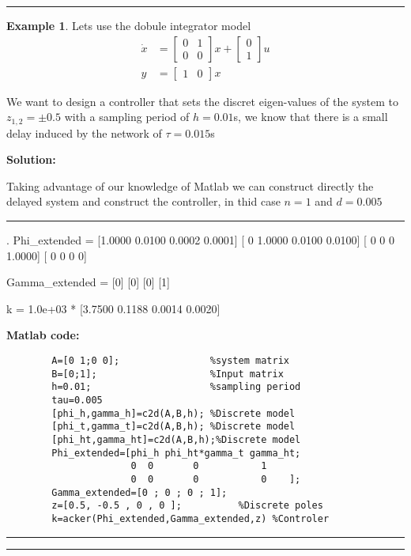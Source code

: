 \documentclass[nols]{tufte-handout}
\theoremstyle{definition}
\newtheorem{exmp}{Example}[section]
\begin{document}

\vspace{1cm}
\hrule height 1pt
\begin{exmp}


Lets use the dobule integrator model
\begin{align*}
\dot{x}
&=
\begin{bmatrix}
0 & 1\\
0 & 0
\end{bmatrix}
x+
\begin{bmatrix}
0\\
1
\end{bmatrix}
u\\
y&=
\begin{bmatrix}
1 & 0
\end{bmatrix}
x
\end{align*}

We want to design a controller that sets the discret eigen-values of the system to $z_{1,2}=\pm 0.5$ with a sampling period of $h=0.01$s, we know that there is a small delay induced by the network of $\tau=0.015$s 

    \textbf{Solution:}

Taking advantage of our knowledge of Matlab we can construct directly the delayed system and construct the controller, in thid case $n=1$ and $d=0.005$

    \noindent\hfil\rule{\textwidth}{.4pt}\hfil
       \begin{verbbox}[\footnotesize]
                                                            .           
Phi_extended =
[1.0000    0.0100    0.0002    0.0001]
[     0    1.0000    0.0100    0.0100]
[     0         0         0    1.0000]
[     0         0         0         0]

Gamma_extended =
[0]
[0]
[0]
[1]

k =
1.0e+03 *
[3.7500    0.1188    0.0014    0.0020]

    \end{verbbox} 
\textbf{Matlab code:}
    \begin{verbatim}
        A=[0 1;0 0];                %system matrix
        B=[0;1];                    %Input matrix
        h=0.01;                     %sampling period
        tau=0.005
        [phi_h,gamma_h]=c2d(A,B,h); %Discrete model
        [phi_t,gamma_t]=c2d(A,B,h); %Discrete model
        [phi_ht,gamma_ht]=c2d(A,B,h);%Discrete model
        Phi_extended=[phi_h phi_ht*gamma_t gamma_ht;
                      0  0       0           1
                      0  0       0           0    ];
        Gamma_extended=[0 ; 0 ; 0 ; 1];
        z=[0.5, -0.5 , 0 , 0 ];          %Discrete poles
        k=acker(Phi_extended,Gamma_extended,z) %Controler
    \end{verbatim}


    \noindent\hfil\rule{\textwidth}{.4pt}\hfil

\hrule height 1pt
\end{exmp}
\vspace{1cm}

\ifx \fillibre \undefined
\end{document}

